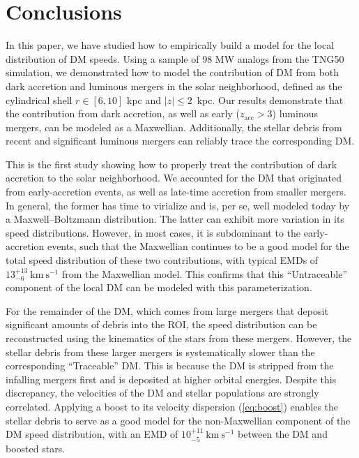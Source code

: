 \documentclass[twocolumn,tighten,twocolappendix]{aastex701}
\newcommand{\zacc}[1]{\ensuremath{z_\mathrm{acc}}}
\newcommand{\kms}{\ensuremath{\text{km}~\text{s}^{-1}}}
\begin{document}
\section{Conclusions} \label{sec:conclusions}
In this paper, we have studied how to empirically build a model for the local distribution of DM speeds. Using a sample of 98 MW analogs from the TNG50 simulation, we demonstrated how to model the contribution of DM from both dark accretion and luminous mergers in the solar neighborhood, defined as the cylindrical shell $r\in[6,10]$ kpc and $|z|\leq 2$~kpc.
Our results demonstrate that the contribution from dark accretion, as well as  early ($\zacc{} > 3$) luminous mergers, can be modeled as a Maxwellian.  Additionally, the stellar debris from recent and significant  luminous mergers can reliably trace the corresponding DM.

This is the first study showing how to properly treat the contribution of dark accretion to the solar neighborhood.  We accounted for the DM that originated from early-accretion events, as well as late-time accretion from smaller mergers. In general, the former has time to virialize and is, per se, well modeled today by a Maxwell--Boltzmann distribution.  The latter can exhibit more variation in its speed distributions.  However, in most cases, it is subdominant to the early-accretion events, such that the Maxwellian continues to be a good model for the total speed distribution of these two contributions, with typical EMDs of $13_{-6}^{+13}~\kms{}$ from the Maxwellian model. This confirms that this ``Untraceable'' component of the local DM can be modeled with this parameterization.

For the remainder of the DM, which comes from large mergers that deposit significant amounts of debris into the ROI, the speed distribution can be reconstructed using the kinematics of the stars from these mergers. However, the stellar debris from these larger mergers is systematically slower than the corresponding ``Traceable'' DM. This is because the DM is stripped from the infalling mergers first and is deposited at higher orbital energies. Despite this discrepancy, the velocities of the DM and stellar populations are strongly correlated. Applying a boost to its velocity dispersion (\autoref{eq:boost}) enables the stellar debris to serve as a good model for the non-Maxwellian component of the DM speed distribution, with an EMD of $10_{-5}^{+11}~\kms{}$ between the DM and boosted stars. 
\end{document}
